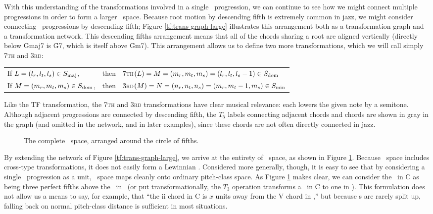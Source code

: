 With this understanding of the transformations involved in a single \tfo\
progression, we can continue to see how we might connect multiple progressions
in order to form a larger \tf\ space. Because root motion by descending
fifth is extremely common in jazz, we might consider connecting \tfo\
progressions by descending fifth; Figure \ref{tf:trans-graph-large}
illustrates this arrangement both as a transformation graph and a
transformation network.  This descending fifths arrangement means that all of
the chords sharing a root are aligned vertically (directly below \h{Gmaj7} is
\h{G7}, which is itself above \h{Gm7}). This arrangement allows us to define
two more transformations, which we will call simply \textsc{7th} and
\textsc{3rd}: \\
%
\vspace{0.5\baselineskip}
\begin{tabular}{lcl}
  If $L = (l_r, l_t, l_s) \in S_{\mathrm{maj}}$, & then &\h{7}\textsc{th}$(L) = M=(m_r, m_t,
  m_s)=(l_r, l_t, l_s-1) \in S_{\mathrm{dom}}$ \\
%
  If $M = (m_r, m_t, m_s) \in S_{\mathrm{dom}}$, & then &\h{3}\textsc{rd}$(M) = N=(n_r, n_t,
  n_s)=(m_r, m_t-1, m_s) \in S_{\mathrm{min}}$
\end{tabular}
\vspace{0em}

\noindent Like the TF transformation, the \textsc{7th} and \textsc{3rd}
transformations have clear musical relevance: each lowers the given note by a
semitone. Although adjacent progressions are connected by descending fifth,
the $T_5$ labels connecting adjacent \ii chords and \I chords
are shown in gray in the graph (and omitted in the network, and in later
examples), since these chords are not often directly connected in jazz.

\begin{figure}[tb]
  \caption{The complete \tf\ space, arranged around the circle of fifths.}
  \label{tf:tf-circle-fifths}
\end{figure}

By extending the network of Figure \ref{tf:trans-graph-large}, we arrive at
the entirety of \tf\ space, as shown in Figure \ref{tf:tf-circle-fifths}.
Because \tf\ space includes cross-type transformations, it does not easily
form a Lewinnian \gis.\fn{tf-8} Considered more generally, though, it is easy
to see that by considering a single \tfo\ progression as a unit, \tf\ space
maps cleanly onto ordinary pitch-class space. As Figure
\ref{tf:tf-circle-fifths} makes clear, we can consider the \tfo\ in C as
being three perfect fifths above the \tfo\ in \Eflat\ (or put
transformationally, the $T_3$ operation transforms a \tfo\ in C to one in
\Eflat). This formulation does not allow us a means to say, for example, that
“the ii chord in C is $x$ units away from the V chord in \Eflat,” but because
\tfo{}s are rarely split up, falling back on normal pitch-class distance is
sufficient in most situations.\fn{tf-9}

